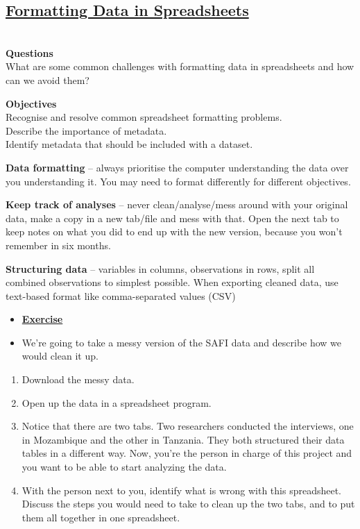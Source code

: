 \documentclass[12pt]{article}
\begin{document}
\subsection{\textbf{\href{https://datacarpentry.org/spreadsheets-socialsci/01-format-data/index.html}{Formatting Data in Spreadsheets}}}

\\\color{Gray}\textbf{{Questions}}
\\ What are some common challenges with formatting data in spreadsheets and how can we avoid them?

\textbf{{Objectives}}
\\Recognise and resolve common spreadsheet formatting problems.
\\Describe the importance of metadata.
\\Identify metadata that should be included with a dataset.
\color{black}

\vspace{1em}
\textbf{Data formatting} – always prioritise the computer understanding the data over you understanding it. You may need to format differently for different objectives.

\textbf{Keep track of analyses} – never clean/analyse/mess around with your original data, make a copy in a new tab/file and mess with that. Open the next tab to keep notes on what you did to end up with the new version, because you won’t remember in six months.

\textbf{Structuring data} – variables in columns, observations in rows, split all combined observations to simplest possible. When exporting cleaned data, use text-based format like comma-separated values (CSV)

\newpage
\color{gray}
\begin{itemize}
\renewcommand{\labelitemi}{$\nobullet$}
\item \textbf{\underline{Exercise}}
\item We’re going to take a messy version of the SAFI data and describe how we would clean it up.
\end{itemize}
\begin{enumerate}
    \item Download the messy data.
    \item Open up the data in a spreadsheet program.
    \item Notice that there are two tabs. Two researchers conducted the interviews, one in Mozambique and the other in Tanzania. They both structured their data tables in a different way. Now, you’re the person in charge of this project and you want to be able to start analyzing the data.
    \item With the person next to you, identify what is wrong with this spreadsheet. Discuss the steps you would need to take to clean up the two tabs, and to put them all together in one spreadsheet.
\end{enumerate}
\color{black}
\end{document}
